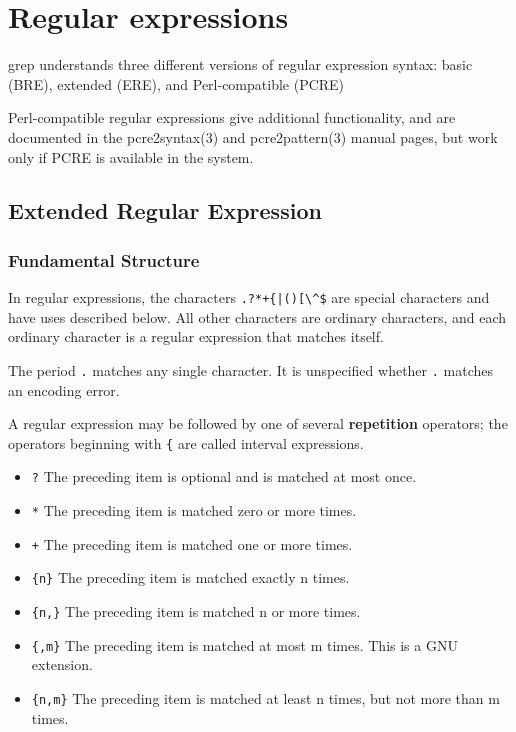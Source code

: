 \chapter{Regular expressions}
grep understands three different versions of regular expression syntax: basic
(BRE), extended (ERE), and Perl-compatible (PCRE)

Perl-compatible regular expressions give additional functionality, and are
documented in the pcre2syntax(3) and pcre2pattern(3) manual pages, but work
only if PCRE is available in the system. 

\section{Extended Regular Expression}

\subsection{Fundamental Structure}

In regular expressions, the characters \verb-.?*+{|()[\^$- are special
characters and have uses described below. All other characters are
ordinary characters, and each ordinary character is a regular
expression that matches itself.

The period \verb+.+ matches any single character. It is unspecified whether
\verb+.+ matches an encoding error.

A regular expression may be followed by one of several {\bf repetition} operators;
the operators beginning with \verb+{+ are called interval expressions.

\begin{itemize}
    \item \verb+?+ The preceding item is optional and is matched at most once.
    \item \verb+*+ The preceding item is matched zero or more times.
    \item \verb-+- The preceding item is matched one or more times.
    \item \verb+{n}+ The preceding item is matched exactly n times.
    \item \verb+{n,}+ The preceding item is matched n or more times.
    \item \verb+{,m}+ The preceding item is matched at most m times. This is a GNU extension.
    \item \verb+{n,m}+ The preceding item is matched at least n times, but not more than m times.
\end{itemize}

